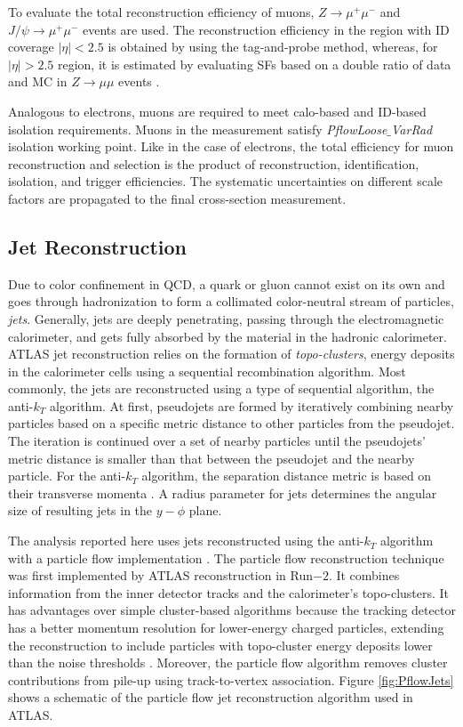 To evaluate the total reconstruction efficiency of muons, $Z \rightarrow \mu^{+}\mu^{-}$ and $J/\psi \rightarrow \mu^{+}\mu^{-}$ events are used. The reconstruction efficiency in the region with ID coverage $|\eta|<2.5$ is obtained by using the tag-and-probe method, whereas, for $|\eta|>2.5$ region, it is estimated by evaluating SFs based on a double ratio of data and MC in $Z \rightarrow \mu\mu$ events \cite{MuonEffLargeEta}.

Analogous to electrons, muons are required to meet calo-based and ID-based isolation requirements. Muons in the measurement satisfy \textit{PflowLoose$\_$VarRad} isolation working point. Like in the case of electrons, the total efficiency for muon reconstruction and selection is the product of reconstruction, identification, isolation, and trigger efficiencies. The systematic uncertainties on different scale factors are propagated to the final cross-section measurement.

\subsection{Jet Reconstruction}
\label{subsec:ParticleRecon_Jets}

Due to color confinement in QCD, a quark or gluon cannot exist on its own and goes through hadronization to form a collimated color-neutral stream of particles, \textit{jets}. Generally, jets are deeply penetrating, passing through the electromagnetic calorimeter, and gets fully absorbed by the material in the hadronic calorimeter. ATLAS jet reconstruction relies on the formation of \textit{topo-clusters}, energy deposits in the calorimeter cells using a sequential recombination algorithm. Most commonly, the jets are reconstructed using a type of sequential algorithm, the anti-$k_{T}$ algorithm. At first, pseudojets are formed by iteratively combining nearby particles based on a specific metric distance to other particles from the pseudojet. The iteration is continued over a set of nearby particles until the pseudojets' metric distance is smaller than that between the pseudojet and the nearby particle. For the anti-$k_{T}$ algorithm, the separation distance metric is based on their transverse momenta \cite{AntiKtAlgo}. A radius parameter for jets determines the angular size of resulting jets in the $y-\phi$ plane. 

The analysis reported here uses jets reconstructed using the anti-$k_{T}$ algorithm with a particle flow implementation \cite{ParticleFlow}\cite{AntiKtAlgo}. The particle flow reconstruction technique was first implemented by ATLAS reconstruction in Run$-2$. It combines information from the inner detector tracks and the calorimeter's topo-clusters. It has advantages over simple cluster-based algorithms because the tracking detector has a better momentum resolution for lower-energy charged particles, extending the reconstruction to include particles with topo-cluster energy deposits lower than the noise thresholds \cite{ParticleFlow}. Moreover, the particle flow algorithm removes cluster contributions from pile-up using track-to-vertex association. Figure \ref{fig:PflowJets} shows a schematic of the particle flow jet reconstruction algorithm used in ATLAS.

